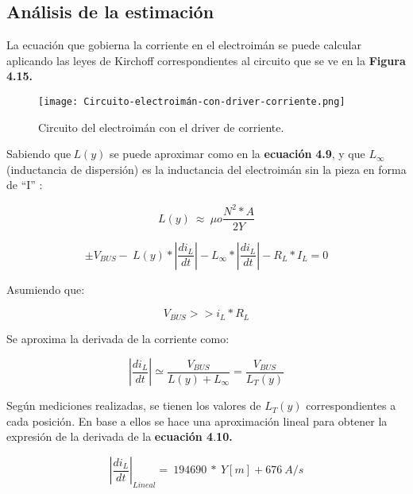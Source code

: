 \subsection{An\'{a}lisis de la estimaci\'{o}n}

\noindent La ecuaci\'{o}n que gobierna la corriente en el electroim\'{a}n se puede calcular aplicando las leyes de Kirchoff correspondientes al circuito que se ve en la \textbf{Figura 4.15.}

\begin{figure}[H]
	\centering
	\texttt{[image: Circuito-electroimán-con-driver-corriente.png]}
	\caption{Circuito del electroimán con el driver de corriente.}
	\label{fig:img_Circuito-electroimán-con-driver-corriente.png}
\end{figure} 

\noindent Sabiendo que$\ L(y)$ se puede aproximar como en la \textbf{ecuaci\'{o}n} \textbf{4.9}, y que $L_{\infty }$(inductancia de dispersi\'{o}n) es la inductancia del electroim\'{a}n sin la pieza en forma de ``I'' :

\begin{equation} \label{eq_inductancia_f(y)}
	L(y)\ \approx \ \mu o\frac{N^2*A}{2Y} 
\end{equation}

\begin{equation} \label{eq_VbusCondicion}
	\pm V_{BUS}-\ L(y)*\left|\frac{{di}_L}{dt}\right|-L_{\infty }*\left|\frac{{di}_L}{dt}\right|-R_L*I_L=0
\end{equation}


\noindent Asumiendo que:

\begin{equation} \label{eq_Derivadadi-dt}
	V_{BUS}>>i_L*R_L
\end{equation}
 
\noindent Se aproxima la derivada de la corriente como:

\begin{equation} \label{eq_derivadaAproximacion}
	\left|\frac{{di}_L}{dt}\right|\simeq \frac{V_{BUS}}{L(y)+L_{\infty }}=\frac{V_{BUS}}{L_T(y)}
\end{equation}

\noindent Seg\'{u}n mediciones realizadas, se tienen los valores de $L_T(y)$ correspondientes a cada posici\'{o}n. En base a ellos se hace una aproximaci\'{o}n lineal para obtener la expresi\'{o}n de la derivada de la \textbf{ecuaci\'{o}n 4}.\textbf{10.}

\noindent 

\begin{equation} \label{eq_di-dt_lineal}
{\left|\frac{{di}_L}{dt}\right|}_{Lineal}=\ 194690\ *\ Y[m]+676\ A/s
\end{equation}

